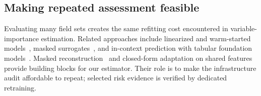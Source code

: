 \subsection{Making repeated assessment feasible}
Evaluating many field sets creates the same refitting cost encountered in variable-importance estimation. Related approaches include linearized and warm-started models~\cite{gao2022lazyvi,sun2025warmstart}, masked surrogates~\cite{covert2021explaining,jethani2022fastshap}, and in-context prediction with tabular foundation models~\cite{hollmann2025tabpfn}. Masked reconstruction~\cite{yoon2020vime,he2022mae} and closed-form adaptation on shared features~\cite{bertinetto2019r2d2,lee2019metaoptnet} provide building blocks for our estimator. Their role is to make the infrastructure audit affordable to repeat; selected risk evidence is verified by dedicated retraining.
